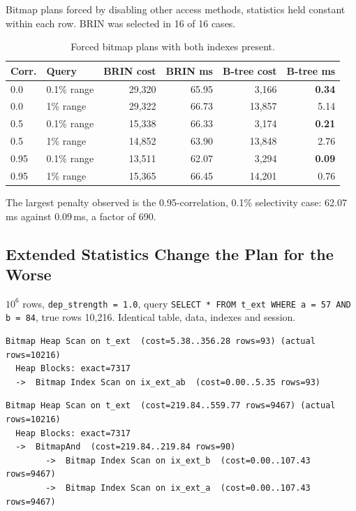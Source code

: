 \documentclass[12pt, a4paper]{article}
\begin{document}
Bitmap plans forced by disabling other access methods, statistics held
constant within each row. BRIN was selected in 16 of 16 cases.

\begin{table}[htbp]
\centering
\caption{Forced bitmap plans with both indexes present.}
\label{tab:suppression}
\small
\begin{tabular}{@{}llrrrr@{}}
\toprule
\textbf{Corr.} & \textbf{Query} & \textbf{BRIN cost} & \textbf{BRIN ms} & \textbf{B-tree cost} & \textbf{B-tree ms} \\
\midrule
0.0 & 0.1\% range & 29{,}320 & 65.95 & 3{,}166 & \textbf{0.34} \\
0.0 & 1\% range & 29{,}322 & 66.73 & 13{,}857 & 5.14 \\
0.5 & 0.1\% range & 15{,}338 & 66.33 & 3{,}174 & \textbf{0.21} \\
0.5 & 1\% range & 14{,}852 & 63.90 & 13{,}848 & 2.76 \\
0.95 & 0.1\% range & 13{,}511 & 62.07 & 3{,}294 & \textbf{0.09} \\
0.95 & 1\% range & 15{,}365 & 66.45 & 14{,}201 & 0.76 \\
\bottomrule
\end{tabular}
\end{table}

The largest penalty observed is the 0.95-correlation, 0.1\% selectivity
case: 62.07\,ms against 0.09\,ms, a factor of 690.

\subsection{Extended Statistics Change the Plan for the Worse}

$10^6$ rows, \texttt{dep\_strength = 1.0}, query
\texttt{SELECT * FROM t\_ext WHERE a = 57 AND b = 84}, true rows
10{,}216. Identical table, data, indexes and session.

\begin{lstlisting}[caption={Without extended statistics. Median of 15 runs: 4.059 ms (stdev 0.473).}]
Bitmap Heap Scan on t_ext  (cost=5.38..356.28 rows=93) (actual rows=10216)
  Heap Blocks: exact=7317
  ->  Bitmap Index Scan on ix_ext_ab  (cost=0.00..5.35 rows=93)
\end{lstlisting}

\begin{lstlisting}[caption={With extended statistics. Median of 15 runs: 5.171 ms (stdev 0.261).}]
Bitmap Heap Scan on t_ext  (cost=219.84..559.77 rows=9467) (actual rows=10216)
  Heap Blocks: exact=7317
  ->  BitmapAnd  (cost=219.84..219.84 rows=90)
        ->  Bitmap Index Scan on ix_ext_b  (cost=0.00..107.43 rows=9467)
        ->  Bitmap Index Scan on ix_ext_a  (cost=0.00..107.43 rows=9467)
\end{lstlisting}
\end{document}
